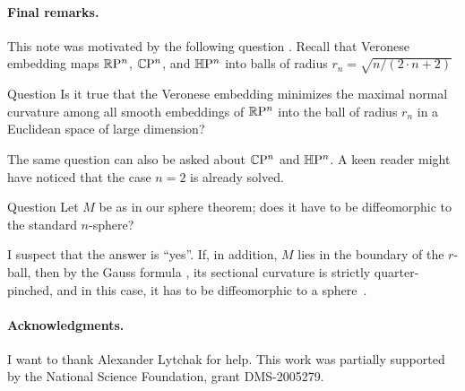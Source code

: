 \documentclass[a4paper,10pt]{article}
\begin{document}
\paragraph{Final remarks.}
This note was motivated by the following question \cite{petrunin2023}.
Recall that Veronese embedding maps $\mathbb{R}\mathrm{P}^n$, $\mathbb{C}\mathrm{P}^n$, and $\mathbb{H}\mathrm{P}^n$ into balls of radius $r_n= \sqrt{n/(2\cdot n+2)}$

\begin{thm}{Question}
Is it true that the Veronese embedding minimizes the maximal normal curvature among all smooth embeddings of $\mathbb{R}\mathrm{P}^n$ into the ball of radius $r_n$ in a Euclidean space of large dimension?
\end{thm}

The same question can also be asked about $\mathbb{C}\mathrm{P}^n$ and $\mathbb{H}\mathrm{P}^n$. 
A keen reader might have noticed that the case $n=2$ is already solved.

\begin{thm}{Question}
Let $M$ be as in our sphere theorem;
does it have to be diffeomorphic to the standard $n$-sphere?
\end{thm}


I suspect that the answer is ``yes''.
If, in addition, $M$ lies in the boundary of the $r$-ball, then by the Gauss formula \cite[Lemma 5]{petrunin2024}, its sectional curvature is strictly quarter-pinched,
and in this case, it has to be diffeomorphic to a sphere~\cite{brendle-schoen}.

\paragraph{Acknowledgments.}
I want to thank Alexander Lytchak for help.
This work was partially supported by the National Science Foundation, grant DMS-2005279.

{\sloppy
\def\emph{\textit}
\printbibliography[heading=bibintoc]
\fussy
}
\end{document}
